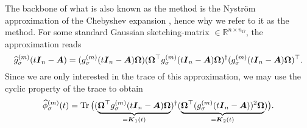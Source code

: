 The backbone of what is also known as the  method \cite{lin2017randomized}
is the Nystr\"om approximation of the Chebyshev expansion ,
hence why we refer to it as the  method. 
For some standard Gaussian \gls{sketching-matrix} $\in \mathbb{R}^{n \times n_{\Omega}}$,
the approximation reads
\begin{equation}
    \widehat{g}_{\sigma}^{(m)}(t\boldsymbol{I}_n - \boldsymbol{A})
    = (g_{\sigma}^{(m)}(t\boldsymbol{I}_n - \boldsymbol{A}) \boldsymbol{\Omega}) (\boldsymbol{\Omega}^{\top} g_{\sigma}^{(m)}(t\boldsymbol{I}_n - \boldsymbol{A}) \boldsymbol{\Omega})^{\dagger} (g_{\sigma}^{(m)}(t\boldsymbol{I}_n - \boldsymbol{A}) \boldsymbol{\Omega})^{\top}.
    \label{equ:3-nystrom-nystrom-smoothing-kernel}
\end{equation}
Since we are only interested in the trace of this approximation,
we may use the cyclic property of the trace to obtain
\begin{equation}
    \widehat{\phi}_{\sigma}^{(m)}(t)
        = \operatorname{Tr}\big((\underbrace{\boldsymbol{\Omega}^{\top} g_{\sigma}^{(m)}(t\boldsymbol{I}_n - \boldsymbol{A}) \boldsymbol{\Omega}}_{=\boldsymbol{K}_1(t)})^{\dagger} (\underbrace{\boldsymbol{\Omega}^{\top} (g_{\sigma}^{(m)}(t\boldsymbol{I}_n - \boldsymbol{A}))^2 \boldsymbol{\Omega}}_{=\boldsymbol{K}_2(t)})\big).
    \label{equ:3-nystrom-spectral-density}
\end{equation}\\

